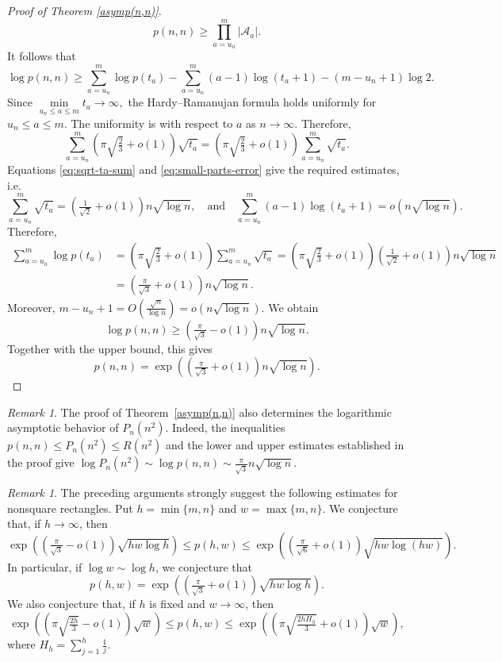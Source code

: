 \documentclass[12pt,a4paper]{amsart}
\numberwithin{equation}{section}
\theoremstyle{plain}
\theoremstyle{definition}
\theoremstyle{remark}
\newtheorem{re}[thm]{Remark}
\begin{document}
\begin{proof}[Proof of Theorem \ref{asymp(n,n)}]
$$
p(n,n)
\geq
\prod_{a=u_n}^{m}|\mathcal A_a|.
$$
It follows that
$$
\log p(n,n)
\geq
\sum_{a=u_n}^{m}\log p(t_a)
-
\sum_{a=u_n}^{m}(a-1)\log(t_a+1)
-
(m-u_n+1)\log2.
$$
Since
$
\min\limits_{u_n\le  a\le  m} t_a\to\infty,
$
the Hardy--Ramanujan formula holds uniformly for \mbox{$u_n\le  a\le  m$}. The uniformity is with respect to $a$ as $n\to\infty$. Therefore,
$$
\sum_{a=u_n}^{m}
\left(\pi\sqrt{\tfrac23}+o(1)\right)\sqrt{t_a}
=
\left(\pi\sqrt{\tfrac23}+o(1)\right)
\sum_{a=u_n}^{m}\sqrt{t_a}.
$$
Equations \eqref{eq:sqrt-ta-sum} and \eqref{eq:small-parts-error} give the required estimates, i.e. 
$$
\sum_{a=u_n}^{m}\sqrt{t_a}
=
\left(\tfrac{1}{\sqrt2}+o(1)\right)n\sqrt{\log n},\quad\text{and}\quad \sum_{a=u_n}^{m}(a-1)\log(t_a+1)=o(n\sqrt{\log n}).$$ 
Therefore,
\begin{align*}
\sum_{a=u_n}^{m}\log p(t_a)
&=
\left(\pi\sqrt{\tfrac23}+o(1)\right)
\sum_{a=u_n}^{m}\sqrt{t_a}=
\left(\pi\sqrt{\tfrac23}+o(1)\right)
\left(\tfrac1{\sqrt2}+o(1)\right)
n\sqrt{\log n}
\\&=
\left(\tfrac{\pi}{\sqrt3}+o(1)\right)
n\sqrt{\log n}.
\end{align*}
Moreover, $m-u_n+1=O(\tfrac{\sqrt n}{\log n})=o(n\sqrt{\log n})$. We obtain
$$
\log p(n,n)
\geq
\left(\tfrac{\pi}{\sqrt3}-o(1)\right)n\sqrt{\log n}.
$$
Together with the upper bound, this gives
$$
p(n,n)
=
\exp\left(
\left(\tfrac{\pi}{\sqrt3}+o(1)\right)n\sqrt{\log n}
\right).
$$







\end{proof}
\begin{re}
The proof of Theorem~\ref{asymp(n,n)} also determines the logarithmic asymptotic behavior of $P_n(n^2)$. Indeed, the inequalities $p(n,n)\le  P_n(n^2)\le  R(n^2)$ and the lower and upper estimates established in the proof give
$
\log P_n(n^2)
\sim
\log p(n,n)
\sim
\tfrac{\pi}{\sqrt3}n\sqrt{\log n}.
$
\end{re}


\begin{re}
The preceding arguments strongly suggest the following estimates for nonsquare rectangles. Put $h=\min\{m,n\}$ and $w=\max\{m,n\}$. We conjecture that, if $h\to\infty$, then
$$
\exp\left(
\left(\tfrac{\pi}{\sqrt3}-o(1)\right)\sqrt{hw\log h}
\right)
\le 
p(h,w)
\le 
\exp\left(
\left(\tfrac{\pi}{\sqrt6}+o(1)\right)\sqrt{hw\log(hw)}
\right).
$$
In particular, if $\log w\sim\log h$, we conjecture that
$$
p(h,w)
=
\exp\left(
\left(\tfrac{\pi}{\sqrt3}+o(1)\right)\sqrt{hw\log h}
\right).
$$
We also conjecture that, if $h$ is fixed and $w\to\infty$, then
$$
\exp\left(
\left(\pi\sqrt{\tfrac{2h}{3}}-o(1)\right)\sqrt w
\right)
\le 
p(h,w)
\le 
\exp\left(
\left(\pi\sqrt{\tfrac{2hH_h}{3}}+o(1)\right)\sqrt w
\right),
$$
where $H_h=\sum_{j=1}^{h}\tfrac1j$.
\end{re}
\end{document}
